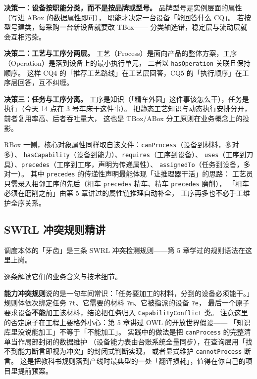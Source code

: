 \textbf{决策一：设备按职能分类，而不是按品牌或型号。}
品牌型号是实例层面的属性（写进 ABox 的数据属性即可），
职能才决定一台设备「能回答什么 CQ」。
若按型号建类，每采购一台新设备就要改 TBox——
分类轴选错，稳定层与流动层就会互相污染。

\textbf{决策二：工艺与工序分两层。}
工艺（Process）是面向产品的整体方案，工序（Operation）是落到设备上的最小执行单元，
二者以 \texttt{hasOperation} 关联且保持顺序。
这样 CQ4 的「推荐工艺路线」在工艺层回答，CQ5 的「执行顺序」在工序层回答，互不纠缠。

\textbf{决策三：任务与工序分离。}
工序是知识（「精车外圆」这件事该怎么干），任务是执行（今天 14 点在 3 号车床干这件事）。
把静态工艺知识与动态执行安排分开，前者复用率高、后者吞吐量大，
这也是 TBox/ABox 分工原则在业务概念上的投影。

RBox 一侧，核心对象属性同样取自该文件：\texttt{canProcess}（设备到材料，多对多）、
\texttt{hasCapability}（设备到能力）、\texttt{requires}（工序到设备）、
\texttt{uses}（工序到刀具）、\texttt{precedes}（工序到工序，声明为传递属性）、
\texttt{assignedTo}（任务到设备，多对一）。
其中 \texttt{precedes} 的传递性声明最能体现「让推理器干活」的思路：
工艺员只需录入相邻工序的先后（粗车 \texttt{precedes} 精车、精车 \texttt{precedes} 磨削），
「粗车必须在磨削之前」由第 5 章讲过的属性链推理自动补全，
工序再多也不必手工维护全序关系。

\subsection{SWRL 冲突规则精讲}

调度本体的「牙齿」是三条 SWRL 冲突检测规则——第 5 章学过的规则语法在这里上岗。



逐条解读它们的业务含义与技术细节。

\textbf{能力冲突规则}说的是一句车间常识：「任务要加工的材料，分到的设备必须能干。」
规则体依次绑定任务 \texttt{?t}、它需要的材料 \texttt{?m}、它被指派的设备 \texttt{?e}，
最后一个原子要求设备\textbf{不能}加工该材料，结论把任务归入 \texttt{CapabilityConflict} 类。
注意这里的否定原子在工程上要格外小心：第 5 章讲过 OWL 的开放世界假设——
「知识库里没说能加工」不等于「不能加工」。
实践中的做法是把 \texttt{canProcess} 的完整清单当作局部封闭的数据维护
（设备能力表由台账系统全量同步），在查询层用「找不到能力断言即视为冲突」的封闭式判断实现，
或者显式维护 \texttt{cannotProcess} 断言。
这是把教科书规则落到产线时最典型的一处「翻译损耗」，值得在你自己的项目里提前预案。

